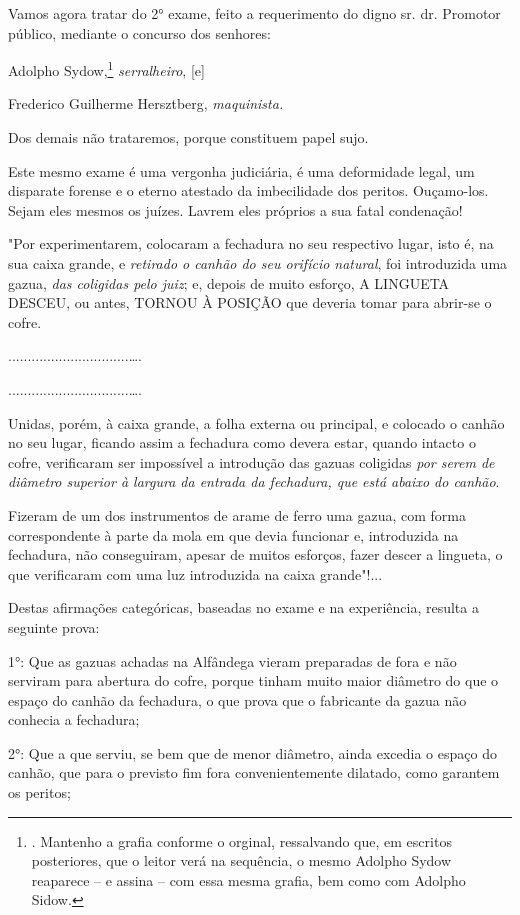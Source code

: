 Vamos agora tratar do 2° exame, feito a requerimento do digno sr. dr.
Promotor público, mediante o concurso dos senhores:

Adolpho Sydow,\footnote{. Mantenho a grafia conforme o orginal,
  ressalvando que, em escritos posteriores, que o leitor verá na
  sequência, o mesmo Adolpho Sydow reaparece -- e assina -- com essa
  mesma grafia, bem como com Adolpho Sidow.} \emph{serralheiro}, {[}e{]}

Frederico Guilherme Hersztberg, \emph{maquinista.}

Dos demais não trataremos, porque constituem papel sujo.

Este mesmo exame é uma vergonha judiciária, é uma deformidade legal, um
disparate forense e o eterno atestado da imbecilidade dos peritos.
Ouçamo-los. Sejam eles mesmos os juízes. Lavrem eles próprios a sua
fatal condenação!

"Por experimentarem, colocaram a fechadura no seu respectivo lugar, isto
é, na sua caixa grande, e \emph{retirado o canhão do seu orifício
natural}, foi introduzida uma gazua, \emph{das coligidas pelo juiz}; e,
depois de muito esforço, A LINGUETA DESCEU, ou antes, TORNOU À POSIÇÃO
que deveria tomar para abrir-se o cofre.

...............................\ldots{}.

...............................\ldots{}.

Unidas, porém, à caixa grande, a folha externa ou principal, e colocado
o canhão no seu lugar, ficando assim a fechadura como devera estar,
quando intacto o cofre, verificaram ser impossível a introdução das
gazuas coligidas \emph{por serem de diâmetro superior à largura da
entrada da fechadura, que está abaixo do canhão}.

Fizeram de um dos instrumentos de arame de ferro uma gazua, com forma
correspondente à parte da mola em que devia funcionar e, introduzida na
fechadura, não conseguiram, apesar de muitos esforços, fazer descer a
lingueta, o que verificaram com uma luz introduzida na caixa grande"!...

Destas afirmações categóricas, baseadas no exame e na experiência,
resulta a seguinte prova:

1°: Que as gazuas achadas na Alfândega vieram preparadas de fora e não
serviram para abertura do cofre, porque tinham muito maior diâmetro do
que o espaço do canhão da fechadura, o que prova que o fabricante da
gazua não conhecia a fechadura;

2°: Que a que serviu, se bem que de menor diâmetro, ainda excedia o
espaço do canhão, que para o previsto fim fora convenientemente
dilatado, como garantem os peritos;

